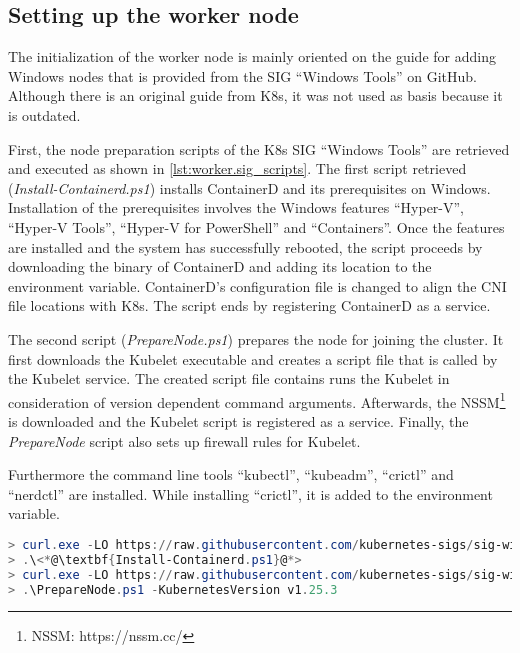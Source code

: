\subsection{Setting up the worker node}\label{chap:implementation.setup_worker}
The initialization of the worker node is mainly oriented on the guide for adding \ac{Windows} nodes that is provided from the \ac{SIG} \enquote{Windows Tools} on GitHub\cite{GitHubKubernetesSIGWindowsTools.20230213}. Although there is an original guide from \ac{K8s}\cite{Kubernetes.20220419}, it was not used as basis because it is outdated.

First, the node preparation scripts of the \ac{K8s} \ac{SIG} \enquote{Windows Tools} are retrieved and executed as shown in \autoref{lst:worker.sig_scripts}. The first script retrieved (\textit{Install-Containerd.ps1}) installs ContainerD and its prerequisites on \ac{Windows}. Installation of the prerequisites involves the Windows features \enquote{Hyper-V}, \enquote{Hyper-V Tools}, \enquote{Hyper-V for PowerShell} and \enquote{Containers}. Once the features are installed and the system has successfully rebooted, the script proceeds by downloading the binary of ContainerD and adding its location to the  environment variable. ContainerD's configuration file is changed to align the \ac{CNI} file locations with \ac{K8s}. The script ends by registering ContainerD as a service.

The second script (\textit{PrepareNode.ps1}) prepares the node for joining the cluster. It first downloads the Kubelet executable and creates a script file that is called by the Kubelet service. The created script file contains runs the Kubelet in consideration of version dependent command arguments. Afterwards, the \ac{NSSM}\footnote{NSSM: https://nssm.cc/} is downloaded and the Kubelet script is registered as a service. Finally, the \textit{PrepareNode} script also sets up firewall rules for Kubelet.

Furthermore the command line tools \enquote{kubectl}, \enquote{kubeadm}, \enquote{crictl} and \enquote{nerdctl} are installed. While installing \enquote{crictl}, it is added to the  environment variable.

\begin{lstlisting}[label=lst:worker.sig_scripts, caption={Retrieval of node preparation scripts\cite{GitHubKubernetesSIGWindowsTools.20230213}}, language=PowerShell, morekeywords={curl.exe, Install-Containerd.ps1, PrepareNode.ps1}]
> curl.exe -LO https://raw.githubusercontent.com/kubernetes-sigs/sig-windows-tools/master/kubeadm/scripts/Install-Containerd.ps1
> .\<*@\textbf{Install-Containerd.ps1}@*>
> curl.exe -LO https://raw.githubusercontent.com/kubernetes-sigs/sig-windows-tools/master/kubeadm/scripts/Prepare<*@\kern.7pt@*>Node.ps1
> .\PrepareNode.ps1 -KubernetesVersion v1.25.3
\end{lstlisting}

